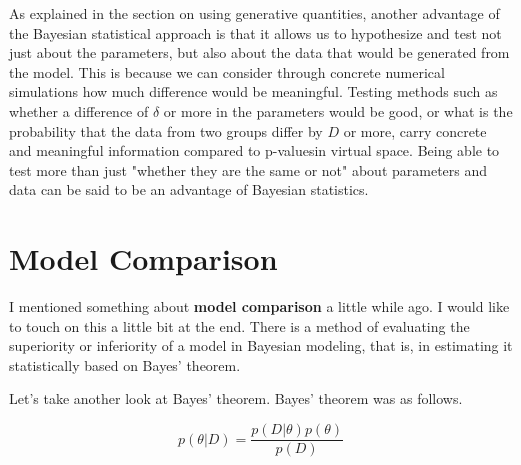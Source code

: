 \documentclass{ltjsbook}
\begin{document}
As explained in the section on using generative quantities, another advantage of the Bayesian statistical approach is that it allows us to hypothesize and test not just about the parameters, but also about the data that would be generated from the model. This is because we can consider through concrete numerical simulations how much difference would be meaningful. Testing methods such as whether a difference of $\delta$ or more in the parameters would be good, or what is the probability that the data from two groups differ by $D$ or more, carry concrete and meaningful information compared to p-values ​​in virtual space. Being able to test more than just "whether they are the same or not" about parameters and data can be said to be an advantage of Bayesian statistics.

\section{Model Comparison}
I mentioned something about \textbf{model comparison} a little while ago. I would like to touch on this a little bit at the end.
There is a method of evaluating the superiority or inferiority of a model in Bayesian modeling, that is, in estimating it statistically based on Bayes' theorem.

Let's take another look at Bayes' theorem. Bayes' theorem was as follows.

\[ p(\theta| D) = \frac{p(D| \theta)p(\theta)}{p(D)} \]
\end{document}
